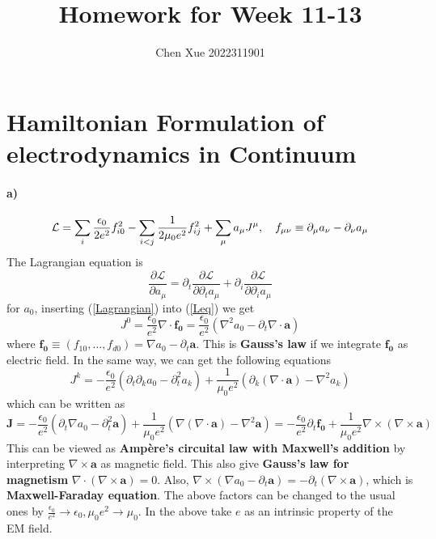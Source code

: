 \documentclass[a4paper,11pt]{article}
\title{Homework for Week 11-13}
\author{Chen Xue  2022311901}
\begin{document}
\maketitle

\section{Hamiltonian Formulation of electrodynamics in Continuum}
\paragraph{a)}
\begin{equation} \label{Lagrangian}
    \mathcal{L} 
    = \sum_i \frac{\epsilon_0}{2e^2} f_{i0}^2 
    - \sum_{i<j} \frac{1}{2\mu_0 e^2} f_{ij}^2
    + \sum_{\mu} a_{\mu}J^{\mu},
    \hspace*{1em}
    f_{\mu \nu} \equiv \partial_{\mu}a_{\nu} - \partial_{\nu} a_{\mu}
\end{equation}
The Lagrangian equation is
\begin{equation} \label{Leq}
    \frac{\partial \mathcal{L}}{\partial a_{\mu}}
    = \partial_t \frac{\partial \mathcal{L}}{\partial \partial_t a_{\mu}}
    + \partial_{i} \frac{\partial \mathcal{L}}{\partial \partial_{i}a_{\mu}}
\end{equation}
for $a_0$, inserting (\ref{Lagrangian}) into (\ref{Leq}) we get 
\begin{equation} \label{J^0}
    J^0 
    = \frac{\epsilon_0}{e^2} \nabla \cdot \bm{f_0} 
    = \frac{\epsilon_0}{e^2} (\nabla^2 a_0 - \partial_t \nabla \cdot \bm{a})
\end{equation}
where $ \bm{f_0} \equiv (f_{10}, \dots, f_{d0}) = \nabla a_0 - \partial_t \bm{a}$. This is \textbf{Gauss's law} if we integrate $\bm{f_0}$ as electric field. In the same way, we can get the following equations
\begin{equation}
    J^k 
    = -\frac{\epsilon_0}{e^2} \left( \partial_t \partial_k a_0 - \partial_t^2 a_k\right)
    + \frac{1}{\mu_0 e^2} \left(\partial_k (\nabla \cdot \bm{a}) - \nabla^2 a_k\right)
\end{equation}
which can be written as
\begin{equation}
    \bm{J} 
    = -\frac{\epsilon_0}{e^2}(\partial_t \nabla a_0 - \partial_t^2 \bm{a})
    + \frac{1}{\mu_0 e^2} (\nabla(\nabla \cdot \bm{a}) - \nabla^2 \bm{a})
    = -\frac{\epsilon_0}{e^2} \partial_t \bm{f_0} 
    + \frac{1}{\mu_0 e^2} \nabla \times (\nabla \times \bm{a})
\end{equation}
This can be viewed as \textbf{Amp\`ere's circuital law with Maxwell's addition} by interpreting $\nabla \times \bm{a}$ as magnetic field. This also give \textbf{Gauss's law for magnetism} $\nabla \cdot (\nabla \times \bm{a}) = 0$. Also, $\nabla \times (\nabla a_0 - \partial _t \bm{a}) = -\partial_t (\nabla \times \bm{a})$, which is \textbf{Maxwell-Faraday equation}.
The above factors can be changed to the usual ones by $ \frac{\epsilon_0}{e^2} \rightarrow \epsilon_0, \mu_0 e^2 \rightarrow \mu_0$. In the above take $e$ as an intrinsic property of the EM field.
\end{document}
